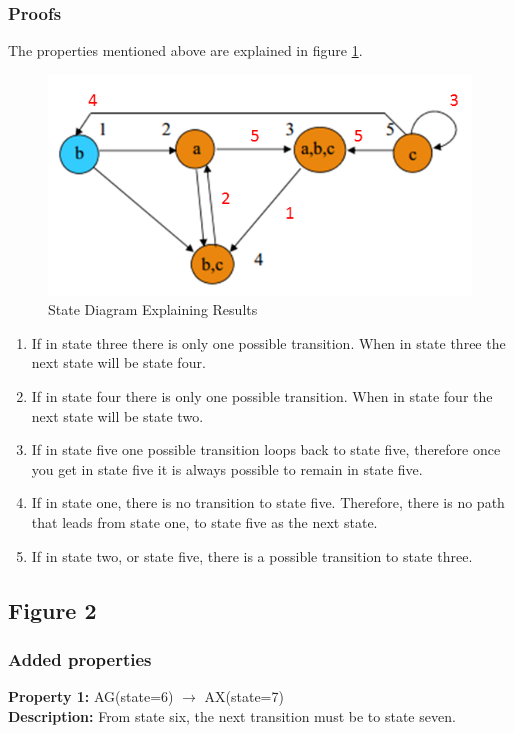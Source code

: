 \documentclass[11pt]{article}
\begin{document}
	\subsubsection{Proofs}
	The properties mentioned above are explained in figure \ref{p2_1_p}.
	\begin{figure}[h]\centering
	\includegraphics[height=0.45\textwidth]{images/p2_1_proof.png}
		\caption{State Diagram Explaining Results}
			\label{p2_1_p}
		\end{figure}
\begin{enumerate}
\item If in state three there is only one possible transition. When in state three the next state will be state four.
\item  If in state four there is only one possible transition. When in state four the next state will be state two.
\item  If in state five one possible transition loops back to state five, therefore once you get in state five it is always possible to remain in state five.
\item  If in state one, there is no transition to state five. Therefore, there is no path that leads from state one, to state five as the next state.
\item  If in state two, or state five, there is a possible transition to state three.
\end{enumerate}	

	
\subsection{Figure 2}
	\subsubsection{Added properties}
	
		\textbf{Property 1:} 	AG(state=6) $\to$ AX(state=7) 	\\	
		\textbf{Description:} From state six, the next transition must be to state seven. \\
		\vspace{12pt}
		
\end{document}

